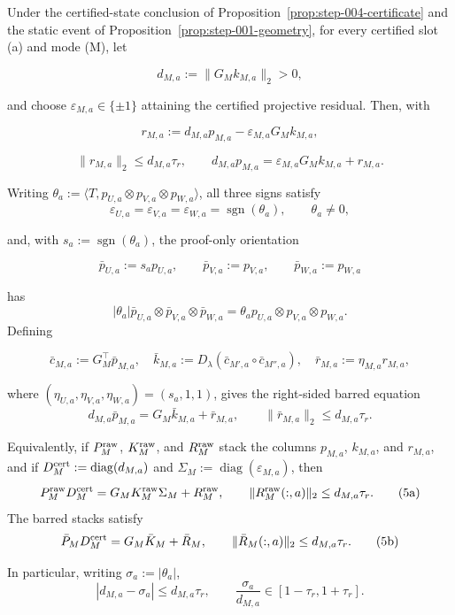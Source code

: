 \begin{lemma}\label{lem:step-005-signed-equation}
Under the certified-state conclusion of Proposition~\ref{prop:step-004-certificate}
and the static event of Proposition~\ref{prop:step-001-geometry}, for every
certified slot (a) and mode (M), let

\[
d_{M,a}:=\|G_Mk_{M,a}\|_2>0,
\]

and choose $\varepsilon_{M,a}\in\{\pm1\}$ attaining the certified
projective residual.  Then, with

\[
r_{M,a}:=d_{M,a}p_{M,a}-\varepsilon_{M,a}G_Mk_{M,a},
\]

\[
\|r_{M,a}\|_2\le d_{M,a}\tau_r,
\qquad
d_{M,a}p_{M,a}=\varepsilon_{M,a}G_Mk_{M,a}+r_{M,a}.
\tag{2}
\]

Writing $\theta_a:=\langle T,p_{U,a}\otimes p_{V,a}\otimes p_{W,a}\rangle$,
all three signs satisfy
\[
\varepsilon_{U,a}=\varepsilon_{V,a}=\varepsilon_{W,a}
=\operatorname{sgn}(\theta_a),
\qquad \theta_a\ne0,
\tag{3}
\]

and, with $s_a:=\operatorname{sgn}(\theta_a)$, the proof-only orientation

\[
\bar p_{U,a}:=s_ap_{U,a},\qquad
\bar p_{V,a}:=p_{V,a},\qquad
\bar p_{W,a}:=p_{W,a}
\tag{4}
\]

has
\[
|\theta_a|\bar p_{U,a}\otimes\bar p_{V,a}\otimes\bar p_{W,a}
=\theta_a p_{U,a}\otimes p_{V,a}\otimes p_{W,a}.
\]
Defining

\[
\bar c_{M,a}:=G_M^\top\bar p_{M,a},\quad
\bar k_{M,a}:=D_\lambda(\bar c_{M',a}\circ\bar c_{M'',a}),\quad
\bar r_{M,a}:=\eta_{M,a}r_{M,a},
\]

where $(\eta_{U,a},\eta_{V,a},\eta_{W,a})=(s_a,1,1)$, gives the
right-sided barred equation
\[
d_{M,a}\bar p_{M,a}=G_M\bar k_{M,a}+\bar r_{M,a},
\qquad \|\bar r_{M,a}\|_2\le d_{M,a}\tau_r.
\tag{5}
\]

Equivalently, if \(P_M^{\rm raw}\), \(K_M^{\rm raw}\), and \(R_M^{\rm raw}\)
stack the columns \(p_{M,a}\), \(k_{M,a}\), and \(r_{M,a}\), and if
\(D_M^{\rm cert}:=\operatorname{diag}(d_{M,a})\) and
\(\Sigma_M:=\operatorname{diag}(\varepsilon_{M,a})\), then
\[
P_M^{\rm raw}D_M^{\rm cert}
=G_MK_M^{\rm raw}\Sigma_M+R_M^{\rm raw},\qquad
\|R_M^{\rm raw}(:,a)\|_2\le d_{M,a}\tau_r.
\tag{5a}
\]
The barred stacks satisfy
\[
\bar P_MD_M^{\rm cert}=G_M\bar K_M+\bar R_M,\qquad
\|\bar R_M(:,a)\|_2\le d_{M,a}\tau_r.
\tag{5b}
\]

In particular, writing $\sigma_a:=|\theta_a|$,
\[
|d_{M,a}-\sigma_a|\le d_{M,a}\tau_r,
\qquad
\frac{\sigma_a}{d_{M,a}}\in[1-\tau_r,1+\tau_r].
\tag{6}
\]


\end{lemma}
